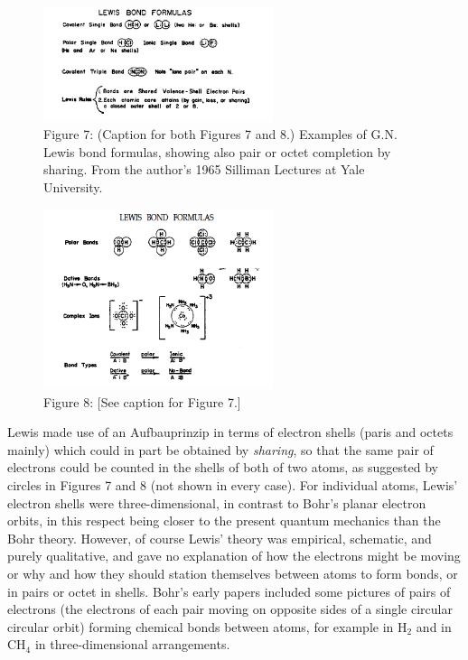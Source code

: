 \documentclass[11pt]{memoir}
\begin{document}

\begin{figure}
\begin{center}
\includegraphics[width=0.6\textwidth]{images/mulliken_figure7.png}
\end{center}
\caption*{Figure 7: (Caption for both Figures 7 and 8.) Examples of G.N. Lewis bond formulas, showing also pair or octet completion by sharing.  From the author's 1965 Silliman Lectures at Yale University.}
\end{figure}

\begin{figure}
\begin{center}
\includegraphics[width=0.6\textwidth]{images/mulliken_figure8.png}
\end{center}
\caption*{Figure 8: [See caption for Figure 7.]}
\end{figure}

Lewis made use of an Aufbauprinzip in terms of electron shells (paris and octets mainly) which could in part be obtained by \emph{sharing}, so that the same pair of electrons could be counted in the shells of both of two atoms, as suggested by circles in Figures 7 and 8 (not shown in every case).  For individual atoms, Lewis' electron shells were three-dimensional, in contrast to Bohr's planar electron orbits, in this respect being closer to the present quantum mechanics than the Bohr theory.  However, of course Lewis' theory was empirical, schematic, and purely qualitative, and gave no explanation of how the electrons might be moving or why and how they should station themselves between atoms to form bonds, or in pairs or octet in shells.  Bohr's early papers included some pictures of pairs of electrons (the electrons of each pair moving on opposite sides of a single circular circular orbit) forming chemical bonds between atoms, for example in $\mathrm{H_2}$ and in $\mathrm{CH_4}$ in three-dimensional arrangements.
\end{document}

